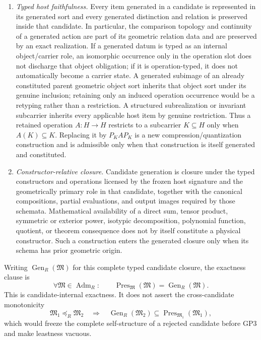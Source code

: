 \documentclass[12pt,a4paper]{article}
\begin{document}
\begin{mdframed}[style=postulatebox,nobreak=false]
\begin{postulate}
\begin{enumerate}[label=(\roman*),leftmargin=2em]
\item \emph{Typed host faithfulness.}  Every item generated in a candidate is
represented in its generated sort and every generated distinction and relation
is preserved inside that candidate.  In particular, the comparison topology
and continuity of a generated action are part of its geometric relation data
and are preserved by an exact realization.  If a generated datum is typed as an internal object/carrier role,
an isomorphic occurrence only in the operation slot does not discharge that
object obligation; if it is operation-typed, it does not automatically become
a carrier state.  A generated subimage of an already constituted parent
geometric object sort inherits that object sort under its genuine inclusion;
retaining only an induced operation occurrence would be a retyping rather than
a restriction.  A structured subrealization or invariant subcarrier inherits every applicable
host item by genuine restriction.  Thus a retained operation \(A:H\to H\) restricts to a
subcarrier \(K\subseteq H\) only when \(A(K)\subseteq K\).  Replacing it by
\(P_KAP_K\) is a new compression/quantization construction and is admissible
only when that construction is itself generated and constituted.

\item \emph{Constructor-relative closure.}  Candidate generation is closure
under the typed constructors and operations licensed by the frozen host
signature and the geometrically primary role in that candidate, together with
the canonical compositions, partial evaluations, and output images required
by those schemata.  Mathematical
availability of a direct sum, tensor product, symmetric or exterior power,
isotypic decomposition, polynomial function, quotient, or theorem consequence
does not by itself constitute a physical constructor.  Such a construction
enters the generated closure only when its schema has prior geometric origin.
\end{enumerate}

Writing \(\operatorname{Gen}_R(\mathfrak M)\) for this complete typed
candidate closure, the exactness clause is
\[
 \forall\mathfrak M\in\operatorname{Adm}_R:\qquad
 \operatorname{Pres}_{\mathfrak M}(\mathfrak M)
 =\operatorname{Gen}_R(\mathfrak M).
 \tag{GP2-exact}
\]
This is candidate-internal exactness.  It does not assert the cross-candidate
monotonicity
\[
 \mathfrak M_1\preceq_R\mathfrak M_2
 \quad\Longrightarrow\quad
 \operatorname{Gen}_R(\mathfrak M_2)
 \subseteq\operatorname{Pres}_{\mathfrak M_1}(\mathfrak M_1),
 \tag{not GP2}
\]
which would freeze the complete self-structure of a rejected candidate before
GP3 and make leastness vacuous.


\end{postulate}
\end{mdframed}
\end{document}

